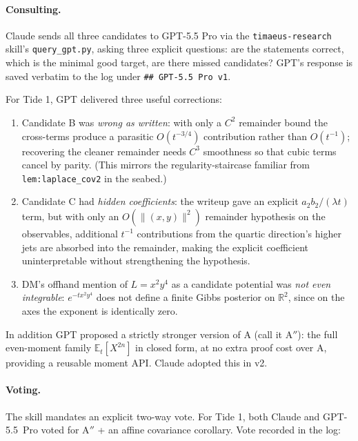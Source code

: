 \documentclass[11pt]{article}
\begin{document}
\paragraph{Consulting.} Claude sends all three candidates to GPT-5.5
Pro via the \texttt{timaeus-research} skill's \texttt{query\_gpt.py},
asking three explicit questions: are the statements correct, which is
the minimal good target, are there missed candidates? GPT's response is
saved verbatim to the log under \texttt{\#\# GPT-5.5~Pro v1}.

For Tide 1, GPT delivered three useful corrections:

\begin{enumerate}
\item Candidate B was \emph{wrong as written}: with only a $C^2$
remainder bound the cross-terms produce a parasitic $O(t^{-3/4})$
contribution rather than $O(t^{-1})$; recovering the cleaner remainder
needs $C^3$ smoothness so that cubic terms cancel by parity. (This
mirrors the regularity-staircase familiar from
\texttt{lem:laplace\_cov2} in the seabed.)

\item Candidate C had \emph{hidden coefficients}: the writeup gave an
explicit $a_2 b_2/(\lambda t)$ term, but with only an $O(\|(x,y)\|^2)$
remainder hypothesis on the observables, additional $t^{-1}$
contributions from the quartic direction's higher jets are absorbed
into the remainder, making the explicit coefficient uninterpretable
without strengthening the hypothesis.

\item DM's offhand mention of $L = x^2 y^4$ as a candidate potential
was \emph{not even integrable}: $e^{-t x^2 y^4}$ does not define a
finite Gibbs posterior on $\mathbb{R}^2$, since on the axes the
exponent is identically zero.
\end{enumerate}

In addition GPT proposed a strictly stronger version of A (call it
A$''$): the full even-moment family $\mathbb{E}_t[X^{2n}]$ in closed
form, at no extra proof cost over A, providing a reusable
moment API. Claude adopted this in v2.

\paragraph{Voting.} The skill mandates an explicit two-way vote. For
Tide 1, both Claude and GPT-5.5~Pro voted for A$''$ + an affine
covariance corollary. Vote recorded in the log:
\end{document}
